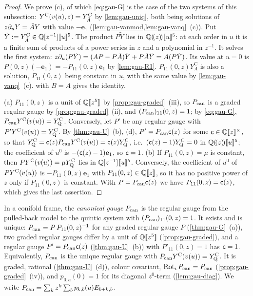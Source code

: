 \begin{proof}
We prove (c), of which \eqref{eq:gau-G} is the case of the two systems of this subsection: $Y^{\mathrm{C}}(v(u),z)=Y^{\mathrm C}_{\tilde A}$ by \cref{lem:gau-uniq}, both being solutions of $z\partial_uY=\tilde AY$ with value $-\mathbf e_1$ (\cref{lem:gau-vanmod,lem:gau-vanq}~(c)). Put $\tilde Y:=Y^{\mathrm C}_{\tilde A}\in\mathbb{Q}[z^{-1}][\![ u ]\!]^5$. The product $P\tilde Y$ lies in $\mathbb{Q}(\!(z)\!)[\![ u ]\!]^5$: at each order in $u$ it is a finite sum of products of a power series in $z$ and a polynomial in $z^{-1}$. It solves the first system: $z\partial_u(P\tilde Y)=(AP-P\tilde A)\tilde Y+P\tilde A\tilde Y=A(P\tilde Y)$. Its value at $u=0$ is $P(0,z)(-\mathbf e_1)=-P_{11}(0,z)\mathbf e_1$ by \cref{lem:gau-R1}. $P_{11}(0,z)Y^{\mathrm C}_A$ is also a solution, $P_{11}(0,z)$ being constant in $u$, with the same value by \cref{lem:gau-vanq}~(c).  with $B=A$ gives the identity.

(a) $P_{11}(0,z)$ is a unit of $\mathbb{Q}[\![ z^5 ]\!]$ by \cref{prop:gau-graded}~(iii), so $P_{\mathrm{can}}$ is a graded regular gauge by \cref{prop:gau-graded}~(ii), and $(P_{\mathrm{can}})_{11}(0,z)=1$; by \eqref{eq:gau-G}, $P_{\mathrm{can}}Y^{\mathrm{C}}(v(u))=Y^{\mathrm{C}}_{\mathrm{Q}}$. Conversely, let $P'$ be any regular gauge with $P'Y^{\mathrm{C}}(v(u))=Y^{\mathrm{C}}_{\mathrm{Q}}$. By \cref{thm:gau-U}~(b), (d), $P'=P_{\mathrm{can}}\mathsf{c}(z)$ for some $\mathsf{c}\in\mathbb{Q}[\![ z ]\!]^\times$, so that $Y^{\mathrm{C}}_{\mathrm{Q}}=\mathsf{c}(z)P_{\mathrm{can}}Y^{\mathrm{C}}(v(u))=\mathsf{c}(z)Y^{\mathrm{C}}_{\mathrm{Q}}$, i.e.\ $(\mathsf{c}(z)-1)Y^{\mathrm{C}}_{\mathrm{Q}}=0$ in $\mathbb{Q}(\!(z)\!)[\![ u ]\!]^5$; the coefficient of $u^0$ is $-(\mathsf{c}(z)-1)\mathbf e_1$, so $\mathsf{c}=1$. (b) If $P_{11}(0,z)=\mu$ is constant, then $PY^{\mathrm{C}}(v(u))=\mu Y^{\mathrm{C}}_{\mathrm{Q}}$ lies in $\mathbb{Q}[z^{-1}][\![ u ]\!]^5$. Conversely, the coefficient of $u^0$ of $PY^{\mathrm{C}}(v(u))$ is $-P_{11}(0,z)\mathbf e_1$ with $P_{11}(0,z)\in\mathbb{Q}[\![ z ]\!]$, so it has no positive power of $z$ only if $P_{11}(0,z)$ is constant. With $P=P_{\mathrm{can}}\mathsf{c}(z)$ we have $P_{11}(0,z)=\mathsf{c}(z)$, which gives the last assertion.
\end{proof}

\begin{defn}
\label{def:gau-can}
In a conifold frame, the \emph{canonical gauge} $P_{\mathrm{can}}$ is the regular gauge from the pulled-back model to the quintic system with $(P_{\mathrm{can}})_{11}(0,z)=1$. It exists and is unique: $P_{\mathrm{can}}=P\,P_{11}(0,z)^{-1}$ for any graded regular gauge $P$ (\cref{thm:gau-G}~(a)), two graded regular gauges differ by a unit of $\mathbb{Q}[\![ z^5 ]\!]$ (\cref{prop:gau-graded}), and a regular gauge $P'=P_{\mathrm{can}}\mathsf{c}(z)$ (\cref{thm:gau-U}~(b)) with $P'_{11}(0,z)=1$ has $\mathsf{c}=1$. Equivalently, $P_{\mathrm{can}}$ is the unique regular gauge with $P_{\mathrm{can}}Y^{\mathrm{C}}(v(u))=Y^{\mathrm{C}}_{\mathrm{Q}}$. It is graded, rational (\cref{thm:gau-U}~(d)), colour covariant, $\operatorname{Rot}_iP_{\mathrm{can}}=P_{\mathrm{can}}$ (\cref{prop:gau-graded}~(iv)), and $p_{0,a}(0)=1$ for its diagonal $z^0$-term (\cref{lem:gau-diag}). We write $P_{\mathrm{can}}=\sum_kz^k\sum_bp_{k,b}(u)E_{b+k,b}$.
\end{defn}

